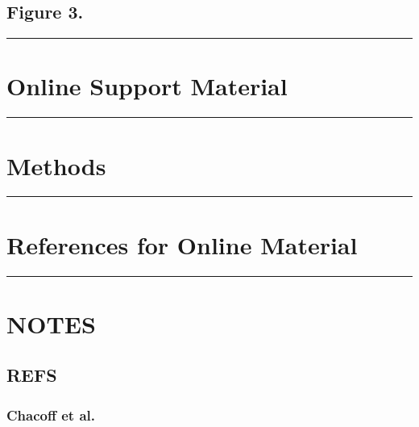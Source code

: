 \documentclass[a4paper,12pt]{article}
\begin{document}
\begin{spacing}{1.0}
\section{\textbf{Figure 3}.}
\label{figure3.}

\begin{center}\rule{3in}{0.4pt}\end{center}


\chapter{Online Support Material}
\label{onlinesupportmaterial}

\begin{center}\rule{3in}{0.4pt}\end{center}


\chapter{Methods}
\label{methods}

\begin{center}\rule{3in}{0.4pt}\end{center}


\chapter{References for Online Material}
\label{referencesforonlinematerial}

\begin{center}\rule{3in}{0.4pt}\end{center}


\chapter{NOTES}
\label{notes}

\section{REFS}
\label{refs}

\subsection{Chacoff et al.}
\label{chacoffetal.}


\end{spacing}
\end{document}
